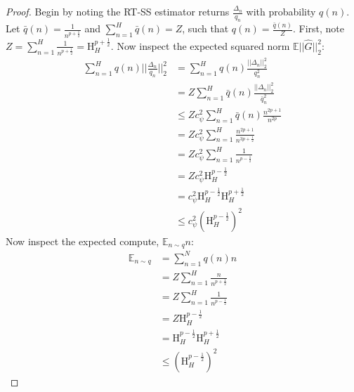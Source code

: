 \begin{proof}
Begin by noting the RT-SS estimator returns $\frac{\Delta_n}{q_n}$ with probability $q(n)$.
Let $\bar{q}(n) = \frac{1}{n^{p + \frac{1}{2}}}$ and
$\sum_{n=1}^H \bar{q}(n) = Z$, such that
$q(n) = \frac{\bar{q}(n)}{Z}$. First, note
$Z = \sum_{n=1}^H \frac{1}{n^{p+\frac{1}{2}}} = \text{H}_{H}^{p+\frac{1}{2}}$.
Now inspect the expected squared norm
$\mathbb{E}||\hat{G}||_2^2$:
\begin{align*}
\sum_{n=1}^H q(n) ||\frac{\Delta_n}{q_n}||_2^2 &=
\sum_{n=1}^H q(n) \frac{||\Delta_n||_2^2}{q_n^2} \\
&= Z \sum_{n=1}^H \bar{q}(n) \frac{||\Delta_n||_2^2}{\bar{q}_n^2}\\
&\leq Z c_\psi^2 \sum_{n=1}^H \bar{q}(n) \frac{n^{2p+1}}{n^{2p}}\\
&= Z c_\psi^2 \sum_{n=1}^H \frac{n^{2p+1}}{n^{3p+\frac{1}{2}}}\\
&= Z c_\psi^2 \sum_{n=1}^H \frac{1}{n^{p-\frac{1}{2}}}\\
&= Z c_\psi^2 \text{H}_H^{p-\frac{1}{2}}\\
&= c_\psi^2 \text{H}_H^{p-\frac{1}{2}} \text{H}_H^{p+\frac{1}{2}}\\
&\leq c_\psi^2 (\text{H}_H^{p-\frac{1}{2}})^2
\end{align*}
Now inspect the expected compute, $\mathbb{E}_{n\sim q} n$:
\begin{align*}
\mathbb{E}_{n\sim q} &= \sum_{n=1}^N q(n) n\\
&= Z \sum_{n=1}^H \frac{n}{n^{p+\frac{1}{2}}}\\
&= Z \sum_{n=1}^H \frac{1}{n^{p-\frac{1}{2}}}\\
&= Z \text{H}_H^{p-\frac{1}{2}}\\
&= \text{H}_H^{p-\frac{1}{2}} \text{H}_H^{p+\frac{1}{2}}\\
&\leq (\text{H}_H^{p-\frac{1}{2}})^2
\end{align*}
\end{proof}

